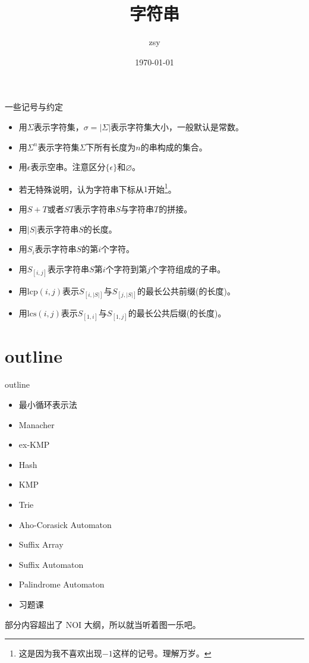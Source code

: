 \documentclass{beamer}
\title{字符串}
\date{\today}
\author{zsy}
\theoremstyle{compact}
\def\lcp{\textrm{lcp}}
\def\lcs{\textrm{lcs}}
\begin{document}
\small
	
	\begin{frame}
	\titlepage
		\begin{center}
		
		\end{center}
	\end{frame}

\begin{frame}{一些记号与约定}
\begin{itemize}
	\item 用$\Sigma$表示字符集，$\sigma = |\Sigma|$表示字符集大小，一般默认是常数。
	\item 用$\Sigma^n$表示字符集$\Sigma$下所有长度为$n$的串构成的集合。
	\item 用$\epsilon$表示空串。注意区分$\{\epsilon\}$和$\varnothing$。
	\item 若无特殊说明，认为字符串下标从$1$开始\footnote{\tiny 这是因为我不喜欢出现$-1$这样的记号。理解万岁。}。
	\item 用$S+T$或者$ST$表示字符串$S$与字符串$T$的拼接。
	\item 用$|S|$表示字符串$S$的长度。
	\item 用$S_i$表示字符串$S$的第$i$个字符。
	\item 用$S_{[i, j]}$表示字符串$S$第$i$个字符到第$j$个字符组成的子串。
	\item 用$\lcp(i,j)$表示$S_{[i, |S|]}$与$S_{[j, |S|]}$的最长公共前缀(的长度)。
	\item 用$\lcs(i,j)$表示$S_{[1, i]}$与$S_{[1, j]}$的最长公共后缀(的长度)。
\end{itemize}
\end{frame}

\section{outline}
\begin{frame}{outline}
\begin{itemize}
	\item 最小循环表示法
	\item Manacher
	\item ex-KMP
	\item Hash
	\item KMP
	\item Trie
	\item Aho-Corasick Automaton
	\item Suffix Array
	\item Suffix Automaton
	\item Palindrome Automaton
	\item 习题课
\end{itemize}

\tiny{部分内容超出了 NOI 大纲，所以就当听着图一乐吧。}

\end{frame}
\end{document}
